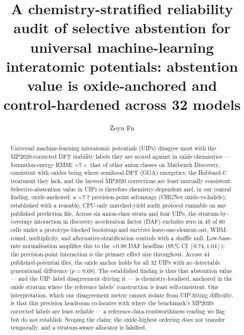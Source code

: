 \documentclass[aip,jcp,preprint,superscriptaddress,amsmath,amssymb]{revtex4-2}
\begin{document}
\title{A chemistry-stratified reliability audit of selective abstention for
universal machine-learning interatomic potentials: abstention value is
oxide-anchored and control-hardened across 32 models}
\author{Zeyu Fu}

\begin{abstract}
\noindent Universal machine-learning interatomic potentials (UIPs) disagree most with the
MP2020-corrected DFT stability labels they are scored against in oxide chemistries ---
formation-energy RMSE $\sim\!7\times$ that of other anion classes on Matbench Discovery,
consistent with oxides being where semilocal-DFT (GGA) energetics, the Hubbard-$U$ treatment
they lack, and the layered MP2020 corrections are least mutually consistent. Selective-abstention value in UIPs is therefore chemistry-dependent and, in our central
finding, oxide-anchored: a $+7.7$ precision-point advantage (CHGNet oxide-vs-halide),
established with a reusable, CPU-only matched-yield audit protocol runnable on any published
prediction file. Across six anion-class
strata and four UIPs, the stratum-by-coverage interaction in discovery acceleration factor
(DAF) excludes zero in 45 of 60 cells under a prototype-blocked bootstrap and survives
leave-one-element-out, WBM-round, multiplicity, and alternative-stratification controls with
a shuffle null. Low-base-rate normalisation
amplifies this to the $+0.90$ DAF headline (95\,\% CI $[0.74, 1.04]$); the precision-point
interaction is the primary effect size throughout.
Across $44$ published-potential files, the oxide anchor holds for all
$32$ UIPs with no detectable generational difference ($p{=}0.68$). The
established finding is thus that abstention value --- and the UIP--label disagreement driving
it --- is chemistry-localised, anchored in the oxide stratum where the reference labels'
construction is least self-consistent. One interpretation, which our
disagreement metric cannot isolate from UIP-fitting difficulty, is that this precision headroom
co-locates with where the benchmark's MP2020-corrected labels are least reliable --- a
reference-data-trustworthiness reading we flag but do not establish. Scoping the claim: the
oxide-highest ordering does not transfer temporally, and a stratum-aware allocator is falsified.
\end{abstract}
\end{document}
